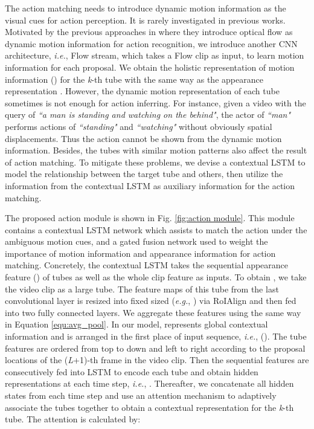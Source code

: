 \documentclass[journal]{IEEEtran}
\begin{document}
The action matching needs to introduce dynamic motion information as the visual cues for action perception. It is rarely investigated in previous works. Motivated by the previous approaches in \cite{kalogeiton2017joint,ji2018end} where they introduce optical flow as dynamic motion information for action recognition, we introduce another CNN architecture, \emph{i.e.}, Flow stream, which takes a Flow clip as input, to learn motion information for each proposal. We obtain the holistic representation of motion information  () for the \emph{k}-th tube  with the same way as the appearance representation . However, the dynamic motion representation of each tube sometimes is not enough for action inferring. For instance, given a video with the query of \emph{``a man is standing and watching on the behind"}, the actor of \emph{``man"} performs actions of \emph{``standing"} and \emph{``watching"} without obviously spatial displacements. Thus the action cannot be shown from the dynamic motion information. Besides, the tubes with similar motion patterns also affect the result of action matching. To mitigate these problems, we devise a contextual LSTM to model the relationship between the target tube and others, then utilize the information from the contextual LSTM as auxiliary information for the action matching.

The proposed action module is shown in Fig. \ref{fig:action module}. This module contains a contextual LSTM network which assists to match the action under the ambiguous motion cues, and a gated fusion network used to weight the importance of motion information and appearance information for action matching. Concretely, the contextual LSTM takes the sequential appearance feature  () of tubes as well as the whole clip feature  as inputs. To obtain , we take the video clip as a large tube. The feature maps of this tube from the last convolutional layer is resized into fixed sized (\emph{e.g.}, ) via RoIAlign and then fed into two fully connected layers. We aggregate these features using the same way in Equation \ref{equ:avg_pool}. In our model,  represents global contextual information and is arranged in the first place of input sequence, \emph{i.e.},  (). The tube features are ordered from top to down and left to right according to the proposal locations of the (\emph{L}+1)-th frame in the video clip. Then the sequential features  are consecutively fed into LSTM to encode each tube and obtain hidden representations at each time step, \emph{i.e.},  . Thereafter, we concatenate all hidden states from each time step  and use an attention mechanism to adaptively associate the tubes together to obtain a contextual representation  for the \emph{k}-th tube. The attention is calculated by:
\end{document}
